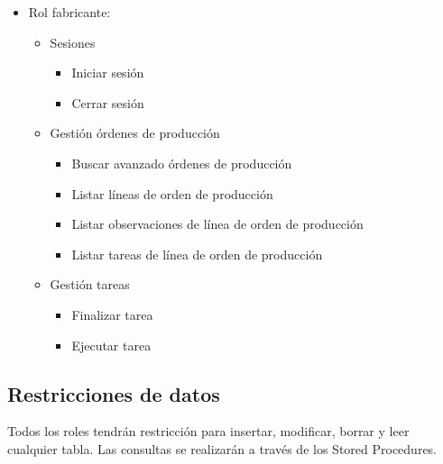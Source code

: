 \begin{itemize}
        \item Rol fabricante:
        \begin{itemize}
            \item Sesiones
            \begin{itemize}
                \item Iniciar sesión
                \item Cerrar sesión
            \end{itemize}
            \item Gestión órdenes de producción
            \begin{itemize}
                \item Buscar avanzado órdenes de producción
                \item Listar líneas de orden de producción
                \item Listar observaciones de línea de orden de producción
                \item Listar tareas de línea de orden de producción
            \end{itemize}
            \item Gestión tareas
            \begin{itemize}
                \item Finalizar tarea
                \item Ejecutar tarea
            \end{itemize}
        \end{itemize}
    \end{itemize}
    \subsection{Restricciones de datos}
    Todos los roles tendrán restricción para insertar, modificar, borrar y leer cualquier tabla. Las consultas se realizarán a través de los Stored Procedures.